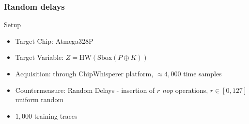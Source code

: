 \begin{frame}
\vspace*{-5pt}
\frametitle{Random delays}
\vspace{-18pt}
\begin{figure}

\end{figure}
\vspace*{-13pt}
\begin{block}{Setup}

\begin{itemize}
\item Target Chip: Atmega328P 
\item Target Variable: $Z = \mathrm{HW}(\mathrm{Sbox}(P\oplus K))$
\item Acquisition: through ChipWhisperer\cite{o2014chipwhisperer} platform, $\approx 4,000$ time samples
\item Countermeasure: Random Delays - insertion of $r$ \emph{nop} operations, $r \in [0,127]$ uniform random
\item $1,000$ training traces

\end{itemize}
\end{block}


\end{frame}

